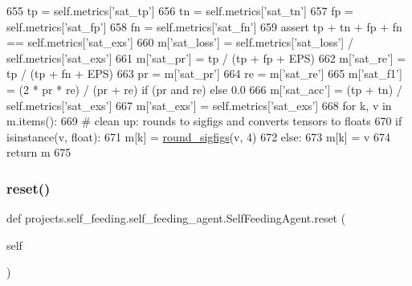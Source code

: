 \begin{DoxyCode}
655                 tp = self.metrics[\textcolor{stringliteral}{'sat\_tp'}]
656                 tn = self.metrics[\textcolor{stringliteral}{'sat\_tn'}]
657                 fp = self.metrics[\textcolor{stringliteral}{'sat\_fp'}]
658                 fn = self.metrics[\textcolor{stringliteral}{'sat\_fn'}]
659                 \textcolor{keyword}{assert} tp + tn + fp + fn == self.metrics[\textcolor{stringliteral}{'sat\_exs'}]
660                 m[\textcolor{stringliteral}{'sat\_loss'}] = self.metrics[\textcolor{stringliteral}{'sat\_loss'}] / self.metrics[\textcolor{stringliteral}{'sat\_exs'}]
661                 m[\textcolor{stringliteral}{'sat\_pr'}] = tp / (tp + fp + EPS)
662                 m[\textcolor{stringliteral}{'sat\_re'}] = tp / (tp + fn + EPS)
663                 pr = m[\textcolor{stringliteral}{'sat\_pr'}]
664                 re = m[\textcolor{stringliteral}{'sat\_re'}]
665                 m[\textcolor{stringliteral}{'sat\_f1'}] = (2 * pr * re) / (pr + re) \textcolor{keywordflow}{if} (pr \textcolor{keywordflow}{and} re) \textcolor{keywordflow}{else} 0.0
666                 m[\textcolor{stringliteral}{'sat\_acc'}] = (tp + tn) / self.metrics[\textcolor{stringliteral}{'sat\_exs'}]
667                 m[\textcolor{stringliteral}{'sat\_exs'}] = self.metrics[\textcolor{stringliteral}{'sat\_exs'}]
668         \textcolor{keywordflow}{for} k, v \textcolor{keywordflow}{in} m.items():
669             \textcolor{comment}{# clean up: rounds to sigfigs and converts tensors to floats}
670             \textcolor{keywordflow}{if} isinstance(v, float):
671                 m[k] = \hyperlink{namespaceparlai_1_1agents_1_1legacy__agents_1_1seq2seq_1_1utils__v0_af377ec61bfc0423461e7b409ffc883b9}{round\_sigfigs}(v, 4)
672             \textcolor{keywordflow}{else}:
673                 m[k] = v
674         \textcolor{keywordflow}{return} m
675 
\end{DoxyCode}
\mbox{\label{classprojects_1_1self__feeding_1_1self__feeding__agent_1_1SelfFeedingAgent_aa94174029fa282fd301ae01ea2ac90de}} 
\subsubsection{\texorpdfstring{reset()}{reset()}}
{\footnotesize\ttfamily def projects.\+self\+\_\+feeding.\+self\+\_\+feeding\+\_\+agent.\+Self\+Feeding\+Agent.\+reset (\begin{DoxyParamCaption}\item[{}]{self }\end{DoxyParamCaption})}



